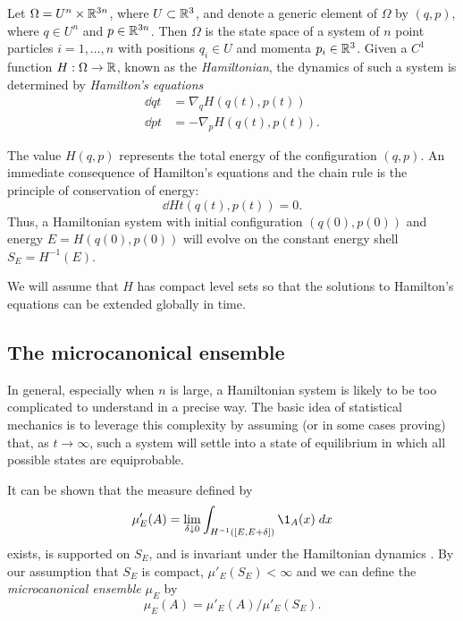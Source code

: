 Let $\Omega = U^n \times {\mathbb R}^{3n}$, where $U \subset {\mathbb R}^3$, and denote a generic element of
$\Omega$ by $(q, p)$, where $q \in U^n$ and $p \in {\mathbb R}^{3n}$. Then $\Omega$ is the state
space of a system of $n$ point particles $i = 1, \ldots, n$ with positions $q_i \in U$
and momenta $p_i \in {\mathbb R}^3$. Given a $C^1$ function $H : \Omega \rightarrow {\mathbb R}$, known as the
\emph{Hamiltonian},
the dynamics of such a system is determined by \emph{Hamilton's equations}
\begin{align}
\dd{q}{t} &= \nabla_q H(q(t), p(t)) \\
\dd{p}{t} &= -\nabla_p H(q(t), p(t)).
\end{align}

The value $H(q, p)$ represents the total energy of the configuration $(q, p)$.
An immediate consequence of Hamilton's equations and the chain rule is the principle
of conservation of energy:
\begin{equation}
\dd{H}{t}(q(t), p(t)) = 0.
\end{equation}
Thus, a Hamiltonian system with initial configuration $(q(0), p(0))$ and energy
$E = H(q(0), p(0))$ will evolve on the constant energy shell $S_E = H^{-1}(E)$.

We will assume that $H$ has compact level sets so that the solutions to Hamilton's
equations can be extended globally in time.


\subsection{The microcanonical ensemble}

In general, especially when $n$ is large, a Hamiltonian system is likely to be too
complicated to understand in a precise way.
The basic idea of statistical mechanics is to leverage this complexity by assuming
(or in some cases proving) that, as $t\to\infty$, such a system will settle into a
state of equilibrium in which all possible states are equiprobable.

It can be shown that the measure defined by
\begin{equation}
\mu'_E(A) = \lim_{\delta\downarrow 0} \int_{H^{-1}([E, E + \delta])} \1_A(x) \; dx
\end{equation}
exists, is supported on $S_E$, and is invariant under the Hamiltonian dynamics
\cite{Adams06}. By our assumption that $S_E$ is compact, $\mu'_E(S_E) < \infty$
and we can define the \emph{microcanonical ensemble} $\mu_E$ by
\begin{equation}
\mu_E(A) = \mu'_E(A) / \mu'_E(S_E).
\end{equation}


